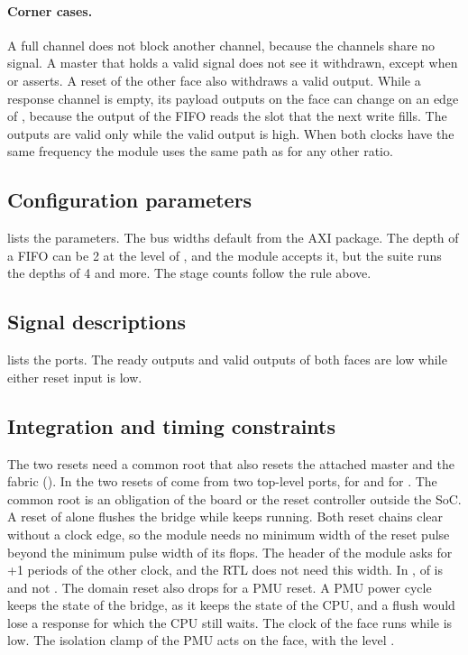 \paragraph{Corner cases.} A full channel does not block another channel, because the channels share no signal. A master that holds a valid signal does not see it withdrawn, except when  or  asserts. A reset of the other face also withdraws a valid output. While a response channel is empty, its payload outputs on the  face can change on an edge of , because the output of the FIFO reads the slot that the next write fills. The outputs are valid only while the valid output is high. When both clocks have the same frequency the module uses the same path as for any other ratio.

\subsection{Configuration parameters}
 lists the parameters. The bus widths default from the AXI package. The depth of a FIFO can be 2 at the level of , and the module accepts it, but the suite runs the depths of 4 and more. The stage counts follow the rule above.



\subsection{Signal descriptions}
 lists the ports. The ready outputs and valid outputs of both faces are low while either reset input is low.



\subsection{Integration and timing constraints}
The two resets need a common root that also resets the attached master and the fabric (). In  the two resets of  come from two top-level ports,  for  and  for . The common root is an obligation of the board or the reset controller outside the SoC. A reset of  alone flushes the bridge while  keeps running. Both reset chains clear without a clock edge, so the module needs no minimum width of the reset pulse beyond the minimum pulse width of its flops. The header of the module asks for +1 periods of the other clock, and the RTL does not need this width. In ,  of  is  and not . The domain reset also drops for a PMU reset. A PMU power cycle keeps the state of the bridge, as it keeps the state of the CPU, and a flush would lose a response for which the CPU still waits. The clock of the  face runs while  is low. The isolation clamp of the PMU acts on the  face, with the level .

